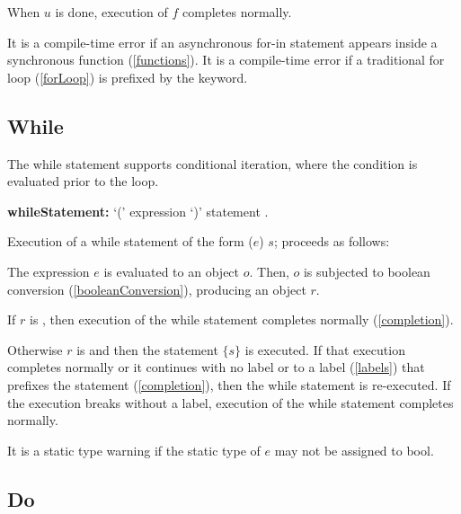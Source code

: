 \documentclass{article}
\newcommand{\code}[1]{{\sf #1}}
\begin{document}
\LMHash{}
When $u$ is done, execution of $f$ completes normally.

\LMHash{}
It is a compile-time error if an asynchronous for-in statement appears inside a synchronous function (\ref{functions}). It is a compile-time error if a traditional for loop  (\ref{forLoop}) is prefixed by the \AWAIT{}  keyword.



\subsection{While}

\LMHash{}
The while statement supports conditional iteration, where the condition is evaluated prior to the loop.

\begin{grammar}
{\bf whileStatement:}
      \WHILE{} `(' expression `)' statement  %
.
 \end{grammar}

\LMHash{}
Execution of a while statement of the form \code{\WHILE{} ($e$) $s$;} proceeds as follows:

\LMHash{}
The expression $e$ is evaluated to an object $o$. Then, $o$ is subjected to boolean conversion (\ref{booleanConversion}), producing an object $r$.

\LMHash{}
If $r$ is \FALSE{}, then execution of the while statement completes normally
(\ref{completion}).

\LMHash{}
Otherwise $r$ is \TRUE{} and then the statement $\{s\}$ is executed.
If that execution completes normally or it continues with no label or to a label (\ref{labels}) that prefixes the \WHILE{} statement (\ref{completion}), then the while statement is re-executed.
If the execution breaks without a label, execution of the while statement completes normally.

\LMHash{}
It is a static type warning if the static type of $e$ may not be assigned to \code{bool}.


\subsection{Do}
\end{document}

